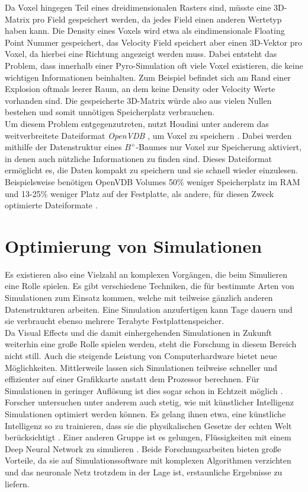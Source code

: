Da Voxel hingegen Teil eines dreidimensionalen Rasters sind, müsste eine 3D-Matrix pro Field gespeichert werden, da jedes Field einen anderen Wertetyp haben kann. Die Density eines Voxels wird etwa als eindimensionale Floating Point Nummer gespeichert, das Velocity Field speichert aber einen 3D-Vektor pro Voxel, da hierbei eine Richtung angezeigt werden muss. Dabei entsteht das Problem, dass innerhalb einer Pyro-Simulation oft viele Voxel existieren, die keine wichtigen Informationen beinhalten. Zum Beispiel befindet sich am Rand einer Explosion oftmals leerer Raum, an dem keine Density oder Velocity Werte vorhanden sind. Die gespeicherte 3D-Matrix würde also aus vielen Nullen bestehen und somit unnötigen Speicherplatz verbrauchen.\\

Um diesem Problem entgegenzutreten, nutzt Houdini unter anderem das weitverbreitete Dateiformat \textit{OpenVDB} \parencite[]{openvdb}, um Voxel zu speichern \parencite[]{volumesopenvdb}. Dabei werden mithilfe der Datenstruktur eines $B^{+}$-Baumes nur Voxel zur Speicherung aktiviert, in denen auch nützliche Informationen zu finden sind. Dieses Dateiformat ermöglicht es, die Daten kompakt zu speichern und sie schnell wieder einzulesen. Beispielsweise benötigen OpenVDB Volumes 50\% weniger Speicherplatz im RAM und 13-25\% weniger Platz auf der Festplatte, als andere, für diesen Zweck optimierte Dateiformate \parencite[S. 27:18]{10.1145/2487228.2487235}.

\section{Optimierung von Simulationen}
Es existieren also eine Vielzahl an komplexen Vorgängen, die beim Simulieren eine Rolle spielen. Es gibt verschiedene Techniken, die für bestimmte Arten von Simulationen zum Einsatz kommen, welche mit teilweise gänzlich anderen Datenstrukturen arbeiten. Eine Simulation anzufertigen kann Tage dauern und sie verbraucht ebenso mehrere Terabyte Festplattenspeicher.\\

Da Visual Effects und die damit einhergehenden Simulationen in Zukunft weiterhin eine große Rolle spielen werden, steht die Forschung in diesem Bereich nicht still. Auch die steigende Leistung von Computerhardware bietet neue Möglichkeiten. Mittlerweile lassen sich Simulationen teilweise schneller und effizienter auf einer Grafikkarte anstatt dem Prozessor berechnen. Für Simulationen in geringer Auflösung ist dies sogar schon in Echtzeit möglich \parencite[S. 9]{Real-Time-incompressible}.\\

Forscher untersuchen unter anderem auch stetig, wie mit künstlicher Intelligenz Simulationen optimiert werden können. Es gelang ihnen etwa, eine künstliche Intelligenz so zu trainieren, dass sie die physikalischen Gesetze der echten Welt berücksichtigt \parencite[]{physicsinformed}. Einer anderen Gruppe ist es gelungen, Flüssigkeiten mit einem Deep Neural Network zu simulieren \parencite[]{deepfluid}. Beide Forschungsarbeiten bieten große Vorteile, da sie auf Simulationssoftware mit komplexen Algorithmen verzichten und das neuronale Netz trotzdem in der Lage ist, erstaunliche Ergebnisse zu liefern. \\
